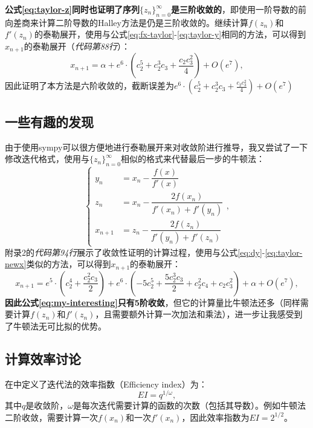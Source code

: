 \textbf{公式\ref{eq:taylor-z}同时也证明了序列$\{z_n\}_{n=0}^\infty$是三阶收敛的}，即使用一阶导数的前向差商来计算二阶导数的Halley方法是仍是三阶收敛的。继续计算$f(z_n)$和$f'(z_n)$的泰勒展开，使用与公式\ref{eq:fx-taylor}-\ref{eq:taylor-y}相同的方法，可以得到$x_{n+1}$的泰勒展开（\textit{代码第88行}）：
\begin{equation}
    \label{eq:taylor-newx}
    x_{n+1} = \alpha + e^{6} \cdot \left(c_{2}^{5} + c_{2}^{3} c_{3} + \frac{c_{2} c_{3}^{2}}{4}\right) + O\left(e^{7}\right),
\end{equation}
因此证明了本方法是六阶收敛的，截断误差为$e^{6} \cdot \left(c_{2}^{5} + c_{2}^{3} c_{3} + \frac{c_{2} c_{3}^{2}}{4}\right) + O\left(e^{7}\right)$


\subsection{一些有趣的发现}

由于使用sympy可以很方便地进行泰勒展开来对收敛阶进行推导，我又尝试了一下修改迭代格式，使用与$\{z_n\}_{n=0}^\infty$相似的格式来代替最后一步的牛顿法：
\begin{equation}
    \label{eq:my-interesting}
    \begin{cases}
        y_n &= x_n - \dfrac{f(x)}{f'(x)} \\
        z_n &= x_n - \dfrac{2f(x_n)}{f'(x_n) + f'(y_n)} \\
        x_{n+1} &= z_n - \dfrac{2f(z_n)}{f'(y_n) + f'(z_n)}
    \end{cases},
\end{equation}
附录2的\textit{代码第94行}展示了收敛性证明的计算过程，使用与公式\ref{eq:dy}-\ref{eq:taylor-newx}类似的方法，可以得到$x_{n+1}$的泰勒展开：
\begin{equation}
    x_{n+1} = e^{5} \cdot \left(c_{2}^{4} + \frac{c_{2}^{2} c_{3}}{2}\right) + e^{6} \cdot \left(- 5 c_{2}^{5} + \frac{5 c_{2}^{3} c_{3}}{2} + c_{2}^{2} c_{4} + c_{2} c_{3}^{2}\right) + \alpha + O\left(e^{7}\right),
\end{equation}
\textbf{因此公式\ref{eq:my-interesting}只有5阶收敛}，但它的计算量比牛顿法还多（同样需要计算$f(z_n)$和$f'(z_n)$，且需要额外计算一次加法和乘法），进一步让我感受到了牛顿法无可比拟的优势。


\subsection{计算效率讨论}

在\cite{househol1967ostrowski}中定义了迭代法的效率指数（Efficiency index）为：
\begin{equation}
    EI = q^{1/\omega},
\end{equation}
其中$q$是收敛阶，$\omega$是每次迭代需要计算的函数的次数（包括其导数）。例如牛顿法二阶收敛，需要计算一次$f(x_n)$和一次$f'(x_n)$，因此效率指数为$EI=2^{1/2}$。

